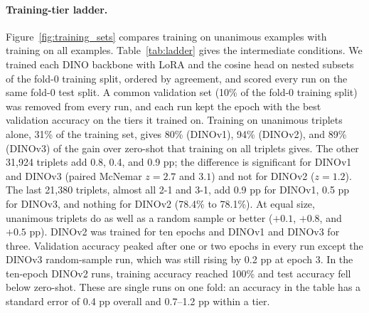 \paragraph{Training-tier ladder.} Figure~\ref{fig:training_sets} compares training on unanimous examples with training on all examples. Table~\ref{tab:ladder} gives the intermediate conditions. We trained each DINO backbone with LoRA and the cosine head on nested subsets of the fold-0 training split, ordered by agreement, and scored every run on the same fold-0 test split. A common validation set (10\% of the fold-0 training split) was removed from every run, and each run kept the epoch with the best validation accuracy on the tiers it trained on. Training on unanimous triplets alone, 31\% of the training set, gives 80\% (DINOv1), 94\% (DINOv2), and 89\% (DINOv3) of the gain over zero-shot that training on all triplets gives. The other 31{,}924 triplets add 0.8, 0.4, and 0.9 pp; the difference is significant for DINOv1 and DINOv3 (paired McNemar $z = 2.7$ and $3.1$) and not for DINOv2 ($z = 1.2$). The last 21{,}380 triplets, almost all 2-1 and 3-1, add 0.9 pp for DINOv1, 0.5 pp for DINOv3, and nothing for DINOv2 (78.4\% to 78.1\%). At equal size, unanimous triplets do as well as a random sample or better ($+0.1$, $+0.8$, and $+0.5$ pp). DINOv2 was trained for ten epochs and DINOv1 and DINOv3 for three. Validation accuracy peaked after one or two epochs in every run except the DINOv3 random-sample run, which was still rising by 0.2 pp at epoch 3. In the ten-epoch DINOv2 runs, training accuracy reached 100\% and test accuracy fell below zero-shot. These are single runs on one fold: an accuracy in the table has a standard error of 0.4 pp overall and 0.7--1.2 pp within a tier.

